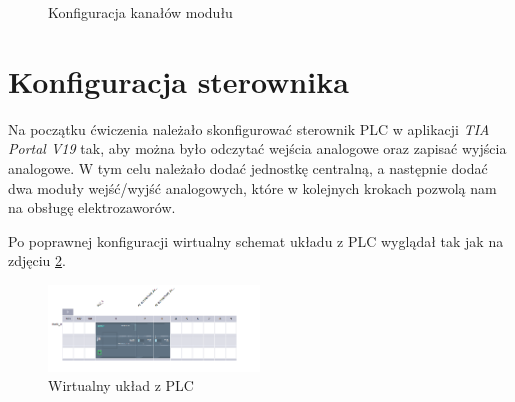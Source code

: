 \documentclass{article}
\begin{document}
\begin{figure}[H]
    \centering
    \caption{Konfiguracja kanałów modułu}
    \label{fig:main0}
\end{figure}


\section{Konfiguracja sterownika}
Na początku ćwiczenia należało skonfigurować sterownik PLC w aplikacji \textit{TIA Portal V19} tak, aby można było odczytać wejścia analogowe oraz zapisać wyjścia analogowe. W tym celu należało dodać jednostkę centralną, a następnie dodać dwa moduły wejść/wyjść analogowych, które w kolejnych krokach pozwolą nam na obsługę elektrozaworów.

Po poprawnej konfiguracji wirtualny schemat układu z PLC wyglądał tak jak na zdjęciu \ref{fig:zdj1}.
\begin{figure}[H]
    \centering
    \includegraphics[width=0.5\textwidth]{media/1_1_Dodanie_modułu.png}
    \caption{Wirtualny układ z PLC}
    \label{fig:zdj1}
\end{figure}
\end{document}
